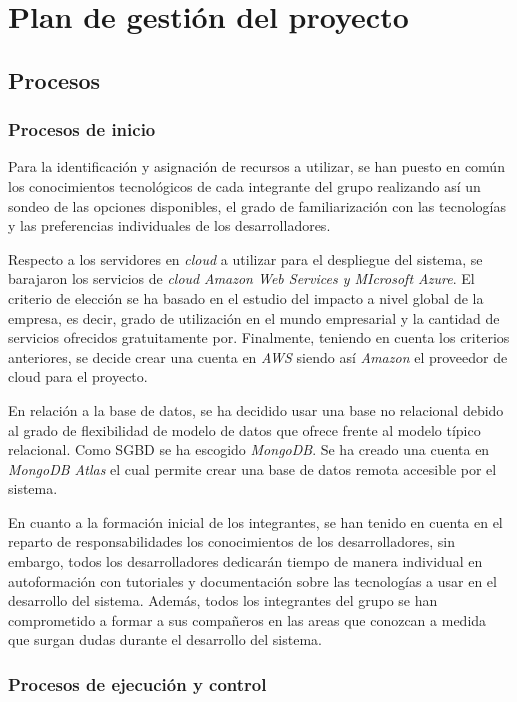 \documentclass{article}
\begin{document}
\section{Plan de gestión del proyecto}

\subsection{Procesos}

\subsubsection{Procesos de inicio}

Para la identificación y asignación de recursos a utilizar, se han puesto en común los conocimientos
tecnológicos de cada integrante del grupo realizando así un sondeo de las opciones disponibles, el 
grado de familiarización con las tecnologías y las preferencias individuales de los desarrolladores. 

Respecto a los servidores en \textit{cloud} a utilizar para el despliegue del sistema, se barajaron
los servicios de \textit{cloud} \textit{Amazon Web Services y MIcrosoft Azure}.
El criterio de elección se ha basado en el estudio del impacto a nivel global de la empresa, es decir,
grado de utilización en el mundo empresarial y la cantidad de servicios ofrecidos gratuitamente por.
Finalmente, teniendo en cuenta los criterios anteriores, se decide crear una cuenta en \textit{AWS} 
siendo así \textit{Amazon} el proveedor de cloud para el proyecto.

\pagebreak
En relación a la base de datos, se ha decidido usar una base no relacional debido al grado de flexibilidad
de modelo de datos que ofrece frente al modelo típico relacional. Como SGBD se ha escogido \textit{MongoDB}.
Se ha creado una cuenta en \textit{MongoDB Atlas} el cual permite crear una base de datos remota accesible
por el sistema.

En cuanto a la formación inicial de los integrantes, se han tenido en cuenta en el reparto de responsabilidades 
los conocimientos de los desarrolladores, sin embargo, todos los desarrolladores dedicarán tiempo de manera individual 
en autoformación con tutoriales y documentación sobre las tecnologías a usar en el desarrollo del sistema.
Además, todos los integrantes del grupo se han comprometido a formar a sus compañeros en las areas que conozcan
a medida que surgan dudas durante el desarrollo del sistema.


\subsubsection{Procesos de ejecución y control}
\end{document}
